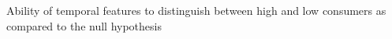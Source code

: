 Ability of temporal features to distinguish between high and low consumers as compared to the null hypothesis
\label{sec:highvslow_nullhypth}